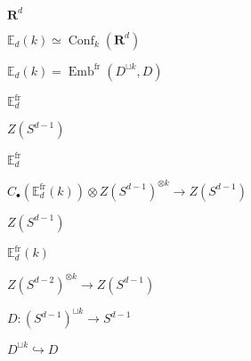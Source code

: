 \begin{preview}
\setcounter{equation}{0}%
\( \mathbf{R}^d \)
\end{preview}

\begin{preview}
\setcounter{equation}{0}%
\( \mathbb{E}_d(k) \simeq \operatorname{Conf}_k( \mathbf{R}^d) \)
\end{preview}

\begin{preview}
\setcounter{equation}{0}%
\( \mathbb{E}_d(k) = \operatorname{Emb}^{\mathrm{f r}}(D^{\sqcup k} , D) \)
\end{preview}

\begin{preview}
\setcounter{equation}{0}%
\(  \mathbb{E}^{\mathrm{f r}}_d \)
\end{preview}

\begin{preview}
\setcounter{equation}{0}%
\( Z(S^{d-1}) \)
\end{preview}

\begin{preview}
\setcounter{equation}{0}%
\(  \mathbb{E}^{\mathrm{f r}}_d \)
\end{preview}

\begin{preview}
\setcounter{equation}{0}%
\( C_{\bullet}( \mathbb{E}^{\mathrm{ f r}}_d(k))  \otimes  Z(S^{d-1})^{\otimes  k} \to Z(S^{d-1}) \)
\end{preview}

\begin{preview}
\setcounter{equation}{0}%
\( Z(S^{d-1}) \)
\end{preview}

\begin{preview}
\setcounter{equation}{0}%
\( \mathbb{E}^{\mathrm{f r}}_d (k) \)
\end{preview}

\begin{preview}
\setcounter{equation}{0}%
\( Z(S^{d-2})^{\otimes  k} \to Z(S^{d-1}) \)
\end{preview}

\begin{preview}
\setcounter{equation}{0}%
\( D: (S^{d-1})^{\sqcup k} \to S^{d-1} \)
\end{preview}

\begin{preview}
\setcounter{equation}{0}%
\( D^{\sqcup k} \hookrightarrow D \)
\end{preview}

